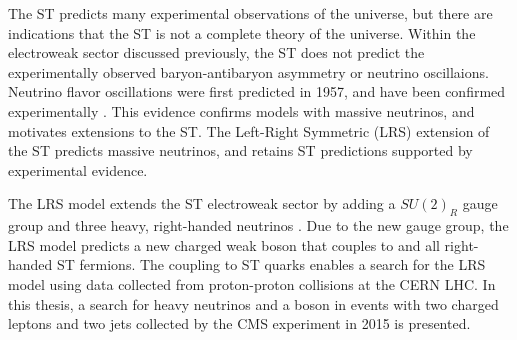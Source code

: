 The ST predicts many experimental observations of the universe, but there are indications that the ST is 
not a complete theory of the universe.  Within the electroweak sector discussed previously, the ST does 
not predict the experimentally observed baryon-antibaryon asymmetry or neutrino oscillaions.  Neutrino flavor 
oscillations were first predicted in 1957, and have been confirmed experimentally 
\cite{kamiokandeTwo,solarNuSummary,NOvAresults,mainzPhaseIIResults,t2kResults,dayaBayResults}.  This evidence confirms 
models with massive neutrinos, and motivates extensions to the ST.  The Left-Right Symmetric (LRS) extension of 
the ST predicts massive neutrinos, and retains ST predictions supported by experimental evidence.

The LRS model extends the ST electroweak sector by adding a $SU(2)_{R}$ gauge group and three heavy, right-handed 
neutrinos \nul.  Due to the new gauge group, the LRS model predicts a new charged weak boson \WR that couples to 
\nul and all right-handed ST fermions.  The \WR coupling to ST quarks enables a search for the LRS model using 
data collected from proton-proton collisions at the CERN LHC.  In this thesis, a search for heavy neutrinos \nul 
and a \WR boson in events with two charged leptons and two jets collected by the CMS experiment in 2015 
is presented.

